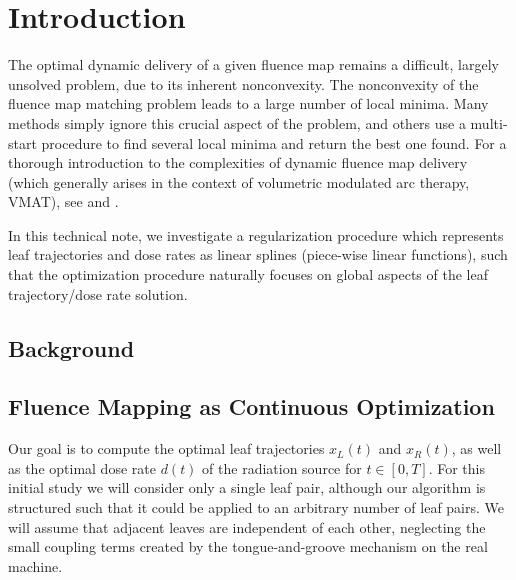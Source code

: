 \section{Introduction}
The optimal dynamic delivery of a given fluence map remains a difficult,
largely unsolved problem, due to its inherent nonconvexity.
The nonconvexity of the fluence map matching problem leads to a large number of local minima.
Many methods simply ignore this crucial aspect of the problem,
and others use a multi-start procedure to find several local minima and return the best one found.
For a thorough introduction to the complexities of dynamic fluence map delivery
(which generally arises in the context of volumetric modulated arc therapy, VMAT),
see \cite{balvertcraft} and \cite{unkvmatreview}.

In this technical note, we investigate a regularization procedure which represents
leaf trajectories and dose rates as linear splines (piece-wise linear functions),
such that the optimization procedure naturally focuses on global aspects of the leaf trajectory/dose rate solution.


\subsection{Background}


\subsection{Fluence Mapping as Continuous Optimization}
\label{sec:FluenceMappingAsContinuousOptimization}

Our goal is to compute the optimal leaf trajectories $x_L(t)$ and $x_R(t)$,
as well as the optimal dose rate $d(t)$ of the radiation source for $t\in[0,T]$.
For this initial study we will consider only a single leaf pair,
although our algorithm is structured such that it could be applied to an arbitrary number of leaf pairs.
We will assume that adjacent leaves are independent of each other,
neglecting the small coupling terms created by the tongue-and-groove mechanism on the real machine.

